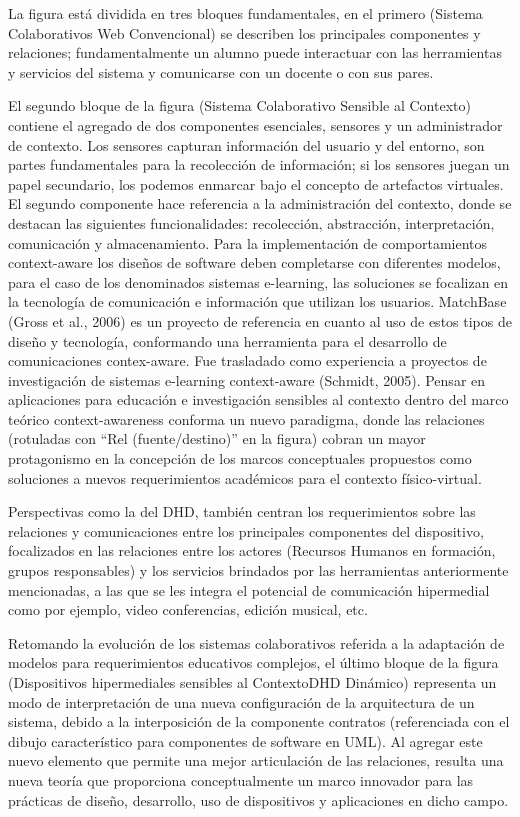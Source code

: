 La figura está dividida en tres bloques fundamentales, en el primero (Sistema
Colaborativos Web Convencional) se describen los principales componentes y
relaciones; fundamentalmente un alumno puede interactuar con las herramientas y
servicios del sistema y comunicarse con un docente o con sus pares.


El segundo bloque de la figura (Sistema Colaborativo Sensible al
Contexto) contiene el
agregado de dos componentes esenciales, sensores y un administrador de contexto.
Los
sensores capturan información del usuario y del entorno, son partes
fundamentales para
la recolección de información; si los sensores juegan un papel secundario, los
podemos
enmarcar bajo el concepto de artefactos virtuales. El segundo componente hace
referencia a la administración del contexto, donde se destacan las siguientes
funcionalidades: recolección, abstracción, interpretación, comunicación y
almacenamiento. Para la implementación de comportamientos context-aware los
diseños de software deben completarse con diferentes modelos, para el caso de
los
denominados sistemas e-learning, las soluciones se focalizan en la tecnología de
comunicación e información que utilizan los usuarios. MatchBase (Gross et al.,
2006)
es un proyecto de referencia en cuanto al uso de estos tipos de diseño y
tecnología,
conformando una herramienta para el desarrollo de comunicaciones contex-aware.
Fue
trasladado como experiencia a proyectos de investigación de sistemas e-learning
context-aware (Schmidt, 2005). Pensar en aplicaciones para educación e
investigación sensibles al contexto dentro del marco teórico context-awareness
conforma un nuevo paradigma, donde las relaciones (rotuladas con “Rel
(fuente/destino)” en la figura) cobran un mayor protagonismo en la concepción de
los marcos conceptuales propuestos como soluciones a nuevos requerimientos
académicos para el contexto físico-virtual.


Perspectivas como la del DHD, también centran los requerimientos sobre
las relaciones y comunicaciones entre los principales componentes del
dispositivo,
focalizados en las relaciones entre los actores (Recursos Humanos en formación,
grupos
responsables) y los servicios brindados por las herramientas anteriormente
mencionadas, a las que se les integra el potencial de comunicación hipermedial
como
por ejemplo, video conferencias, edición musical, etc.

Retomando la evolución de los sistemas colaborativos referida a la adaptación de
modelos
para requerimientos educativos complejos, el último bloque de la figura
(Dispositivos
hipermediales sensibles al ContextoDHD Dinámico) representa un modo de
interpretación de una
nueva configuración de la arquitectura de un sistema, debido a la interposición
de la
componente contratos (referenciada con el dibujo característico para componentes
de
software en UML). Al agregar este nuevo elemento que permite una mejor
articulación
de las relaciones, resulta una nueva teoría que proporciona conceptualmente un
marco
innovador para las prácticas de diseño, desarrollo, uso de dispositivos y
aplicaciones en dicho campo.



